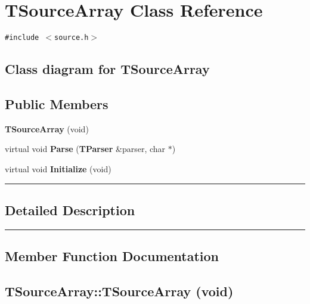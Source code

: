\section{TSourceArray  Class Reference}
\label{TSourceArray}


{\tt \#include $<$source.h$>$}

\subsection*{Class diagram for TSourceArray}
\begin{figure}[H]
\begin{center}
\leavevmode
\setlength{\epsfysize}{3cm}
\end{center}
\end{figure}
\subsection*{Public Members}
\begin{CompactItemize}
\item 
{\bf TSource\-Array} (void)
\item 
virtual void {\bf Parse} ({\bf TParser} \&parser, char $\ast$)
\item 
virtual void {\bf Initialize} (void)
\end{CompactItemize}
\vspace{0.4cm}\hrule\vspace{0.2cm}
\subsection*{Detailed Description}
\vspace{0.4cm}\hrule\vspace{0.2cm}
\subsection*{Member Function Documentation}
\label{TSourceArray_a0}
\subsection{\setlength{\rightskip}{0pt plus 5cm}TSource\-Array::TSource\-Array (void)}

\label{TSourceArray_a1}
